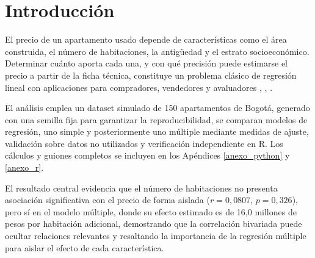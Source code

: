 \section{Introducción}
    El precio de un apartamento usado depende de características como el área
    construida, el número de habitaciones, la antigüedad y el estrato
    socioeconómico. Determinar cuánto aporta cada una, y con qué precisión puede
    estimarse el precio a partir de la ficha técnica, constituye un problema
    clásico de regresión lineal con aplicaciones para compradores, vendedores
    y avaluadores \cite{montgomery2021regression},
    \cite{wooldridge2020econometrics}, \cite{castro2026avanzada}.

    \vspace{10pt}

    El análisis emplea un dataset simulado de 150 apartamentos de Bogotá,
    generado con una semilla fija para garantizar la reproducibilidad, se
    comparan modelos de regresión, uno simple y posteriormente uno múltiple 
    mediante medidas de ajuste, validación sobre datos no utilizados y 
    verificación independiente en R. Los cálculos y guiones completos se 
    incluyen en los Apéndices \ref{anexo_python} y \ref{anexo_r}.

    \vspace{10pt}

    El resultado central evidencia que el número de habitaciones no presenta
    asociación significativa con el precio de forma aislada ($r = 0{,}0807$,
    $p = 0{,}326$), pero sí en el modelo múltiple, donde su efecto estimado es de
    16,0 millones de pesos por habitación adicional, demostrando que la
    correlación bivariada puede ocultar relaciones relevantes y resaltando la
    importancia de la regresión múltiple para aislar el efecto de cada
    característica.